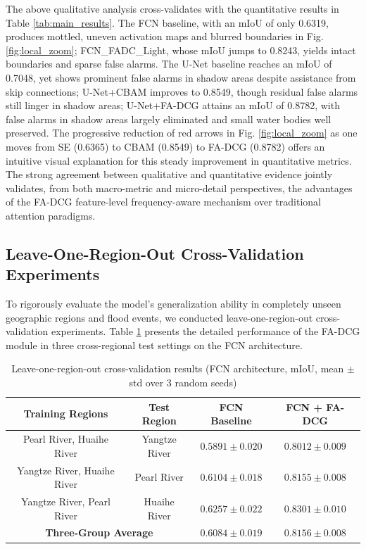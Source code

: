 \documentclass[lettersize,journal]{IEEEtran}
\begin{document}
The above qualitative analysis cross-validates with the quantitative results in Table \ref{tab:main_results}. The FCN baseline, with an mIoU of only 0.6319, produces mottled, uneven activation maps and blurred boundaries in Fig. \ref{fig:local_zoom}; FCN\_FADC\_Light, whose mIoU jumps to 0.8243, yields intact boundaries and sparse false alarms. The U-Net baseline reaches an mIoU of 0.7048, yet shows prominent false alarms in shadow areas despite assistance from skip connections; U-Net+CBAM improves to 0.8549, though residual false alarms still linger in shadow areas; U-Net+FA-DCG attains an mIoU of 0.8782, with false alarms in shadow areas largely eliminated and small water bodies well preserved. The progressive reduction of red arrows in Fig. \ref{fig:local_zoom} as one moves from SE (0.6365) to CBAM (0.8549) to FA-DCG (0.8782) offers an intuitive visual explanation for this steady improvement in quantitative metrics. The strong agreement between qualitative and quantitative evidence jointly validates, from both macro-metric and micro-detail perspectives, the advantages of the FA-DCG feature-level frequency-aware mechanism over traditional attention paradigms.

\subsection{Leave-One-Region-Out Cross-Validation Experiments}

To rigorously evaluate the model's generalization ability in completely unseen geographic regions and flood events, we conducted leave-one-region-out cross-validation experiments. Table \ref{tab:cross_region} presents the detailed performance of the FA-DCG module in three cross-regional test settings on the FCN architecture.

\begin{table}[htbp]
\centering
\caption{Leave-one-region-out cross-validation results (FCN architecture, mIoU, mean $\pm$ std over 3 random seeds)}
\label{tab:cross_region}
\begin{tabular}{cccc}
\toprule
\textbf{Training Regions} & \textbf{Test Region} & \textbf{FCN Baseline} & \textbf{FCN + FA-DCG} \\
\midrule
Pearl River, Huaihe River & Yangtze River & $0.5891 \pm 0.020$ & $\mathbf{0.8012 \pm 0.009}$ \\
Yangtze River, Huaihe River & Pearl River & $0.6104 \pm 0.018$ & $\mathbf{0.8155 \pm 0.008}$ \\
Yangtze River, Pearl River & Huaihe River & $0.6257 \pm 0.022$ & $\mathbf{0.8301 \pm 0.010}$ \\
\midrule
\multicolumn{2}{c}{\textbf{Three-Group Average}} & $0.6084 \pm 0.019$ & $\mathbf{0.8156 \pm 0.008}$ \\
\bottomrule
\end{tabular}
\end{table}
\end{document}

